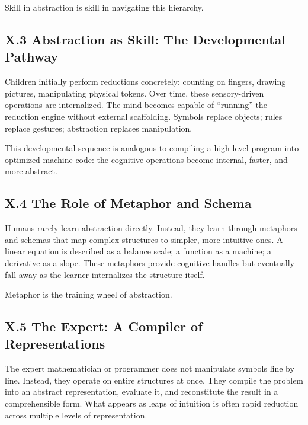 \documentclass[11pt,letterpaper]{article}
\begin{document}
Skill in abstraction is skill in navigating this hierarchy.

\subsection{X.3 Abstraction as Skill: The Developmental Pathway}

Children initially perform reductions concretely: counting on fingers, drawing pictures, manipulating physical tokens. Over time, these sensory-driven operations are internalized. The mind becomes capable of ``running'' the reduction engine without external scaffolding. Symbols replace objects; rules replace gestures; abstraction replaces manipulation.

This developmental sequence is analogous to compiling a high-level program into optimized machine code: the cognitive operations become internal, faster, and more abstract.

\subsection{X.4 The Role of Metaphor and Schema}

Humans rarely learn abstraction directly. Instead, they learn through metaphors and schemas that map complex structures to simpler, more intuitive ones. A linear equation is described as a balance scale; a function as a machine; a derivative as a slope. These metaphors provide cognitive handles but eventually fall away as the learner internalizes the structure itself.

Metaphor is the training wheel of abstraction.

\subsection{X.5 The Expert: A Compiler of Representations}

The expert mathematician or programmer does not manipulate symbols line by line. Instead, they operate on entire structures at once. They compile the problem into an abstract representation, evaluate it, and reconstitute the result in a comprehensible form. What appears as leaps of intuition is often rapid reduction across multiple levels of representation.
\end{document}
